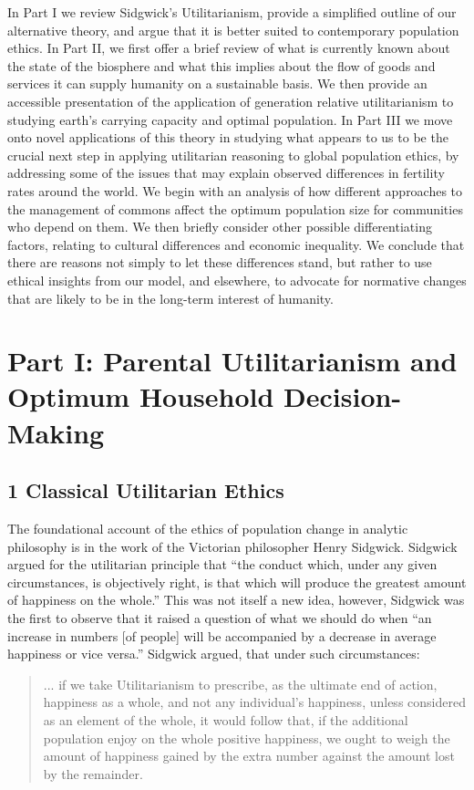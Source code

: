 \documentclass[man,11pt,a4paper,floatsintext]{apa7}
\begin{document}
In Part I we review Sidgwick's Utilitarianism, provide a simplified outline of our alternative theory, and argue that it is better suited to contemporary population ethics. In Part II, we first offer a brief review of what is currently known about the state of the biosphere and what this implies about the flow of goods and services it can supply humanity on a sustainable basis. We then provide an accessible presentation of the application of generation relative utilitarianism to studying earth's carrying capacity and optimal population. In Part III we move onto novel applications of this theory in studying what appears to us to be the crucial next step in applying utilitarian reasoning to global population ethics, by addressing some of the issues that may explain observed differences in fertility rates around the world. We begin with an analysis of how different approaches to the management of commons affect the optimum population size for communities who depend on them. We then briefly consider other possible differentiating factors, relating to cultural differences and economic inequality. We conclude that there are reasons not simply to let these differences stand, but rather to use ethical insights from our model, and elsewhere, to advocate for normative changes that are likely to be in the long-term interest of humanity.

\section{Part I: Parental Utilitarianism and Optimum Household Decision-Making}

\subsection{1 Classical Utilitarian Ethics}

The foundational account of the ethics of population change in analytic philosophy is in the work of the Victorian philosopher Henry Sidgwick. Sidgwick argued for the utilitarian principle that ``the conduct which, under any given circumstances, is objectively right, is that which will produce the greatest amount of happiness on the whole.'' This was not itself a new idea, however, Sidgwick was the first to observe that it raised a question of what we should do when ``an increase in numbers [of people] will be accompanied by a decrease in average happiness or vice versa.'' Sidgwick argued, that under such circumstances:

\begin{quote}
... if we take Utilitarianism to prescribe, as the ultimate end of action, happiness as a whole, and not any individual's happiness, unless considered as an element of the whole, it would follow that, if the additional population enjoy on the whole positive happiness, we ought to weigh the amount of happiness gained by the extra number against the amount lost by the remainder.
\end{quote}
\end{document}
